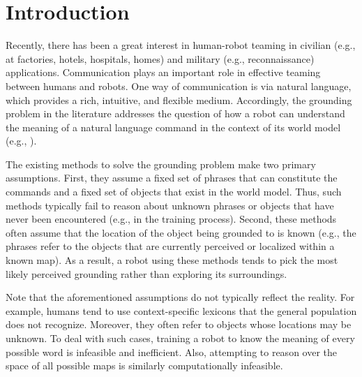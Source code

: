 \section{Introduction}
Recently, there has been a great interest in human-robot teaming in civilian (e.g., at factories, hotels, hospitals, homes) and military (e.g., reconnaissance) applications. Communication plays an important role in effective teaming between humans and robots. One way of communication is via natural language, which provides a rich, intuitive, and flexible medium. Accordingly, the grounding problem in the literature addresses the question of how a robot can understand the meaning of a natural language command in the context of its world model (e.g., \cite{g3,dcg}). 

The existing methods to solve the grounding problem make two primary assumptions. First, they assume a fixed set of phrases that can constitute the commands and a fixed set of objects that exist in the world model. Thus, such methods typically fail to reason about unknown phrases or objects that have never been encountered (e.g., in the training process).
Second, these methods often assume that the location of the object being grounded to is known (e.g., the phrases refer to the objects that are currently perceived or localized within a known map).
As a result, a robot using these methods tends to pick the most likely perceived grounding rather than exploring its surroundings.

Note that the aforementioned assumptions do not typically reflect the reality. For example, humans tend to use context-specific lexicons that the general population does not recognize. Moreover, they often refer to objects whose locations may be unknown. To deal with such cases, training a robot to know the meaning of every possible word is infeasible and inefficient. Also, attempting to reason over the space of all possible maps is similarly computationally infeasible.

